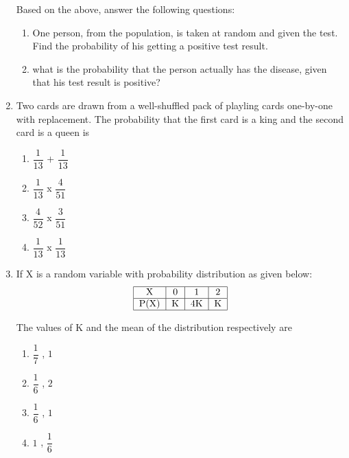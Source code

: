 \documentclass[a4paper,12pt]{article}
\begin{document}
\begin{enumerate}
Based on the above, answer the following questions:\
\begin{enumerate}
\item One person, from the population, is taken at random and  given the test. Find the probability of his getting a positive test result.

\item what is the probability that the person actually has the disease, given that his test result is positive?
\end{enumerate}

\item Two cards are drawn from a well-shuffled pack of playling cards one-by-one with replacement. The probability that the first card is a king and the second card is a queen is 

\begin{enumerate}
\item $\dfrac{1}{13}$ + $\dfrac{1}{13}$\\
\item $\dfrac{1}{13}$ x $\dfrac{4}{51}$\\
\item $\dfrac{4}{52}$ x $\dfrac{3}{51}$\\
\item $\dfrac{1}{13}$ x $\dfrac{1}{13}$\\
\end{enumerate}

\item If X is a random variable with probability distribution as given below:\\
$$\begin{tabular}{|c|c|c|c|}
\hline
X & 0 & 1 & 2 \\
\hline
P(X) & K & 4K & K \\
\hline 

\end{tabular}$$

The values  of K and the mean of the distribution respectively are\\
\begin{enumerate}
\item  $\dfrac{1}{7}$ , $1$\\
\item  $\dfrac{1}{6}$ , $2$\\
\item  $\dfrac{1}{6}$ , $1$\\
\item  $1$ , $\dfrac{1}{6}$\\
\end{enumerate}


\end{enumerate}
\end{document}
